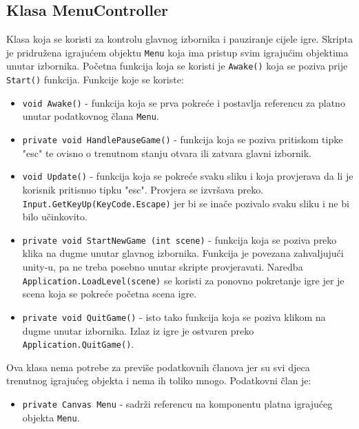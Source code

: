 \subsection{Klasa MenuController}
Klasa koja se koristi za kontrolu glavnog izbornika i pauziranje cijele igre. Skripta je pridružena igrajućem objektu \texttt{Menu} koja ima pristup svim igrajućim objektima unutar izbornika. Početna funkcija koja se koristi je \texttt{Awake()} koja se poziva prije \texttt{Start()} funkcija. Funkcije koje se koriste:
\begin{itemize}
	\item \texttt{void Awake()} - funkcija koja se prva pokreće i postavlja referencu za platno unutar podatkovnog člana \texttt{Menu}.
	\item \texttt{private void HandlePauseGame()} - funkcija koja se poziva pritiskom tipke "esc" te ovisno o trenutnom stanju otvara ili zatvara glavni izbornik.
	\item \texttt{void Update()} - funkcija koja se pokreće svaku sliku i koja provjerava da li je korisnik pritisnuo tipku "esc". Provjera se izvršava preko. \texttt{Input.GetKeyUp(KeyCode.Escape)} jer bi se inače pozivalo svaku sliku i ne bi bilo učinkovito.
	\item \texttt{private void StartNewGame (int scene)} - funkcija koja se poziva preko klika na dugme unutar glavnog izbornika. Funkcija je povezana zahvaljujući unity-u, pa ne treba posebno unutar skripte provjeravati. Naredba \texttt{Application.LoadLevel(scene)} se koristi za ponovno pokretanje igre jer je scena koja se pokreće početna scena igre.
	\item \texttt{private void QuitGame()} - isto tako funkcija koja se poziva klikom na dugme unutar izbornika. Izlaz iz igre je ostvaren preko \newline \texttt{Application.QuitGame()}.
\end{itemize}
Ova klasa nema potrebe za previše podatkovnih članova jer su svi djeca trenutnog igrajućeg objekta i nema ih toliko mnogo. Podatkovni član je:
\begin{itemize}
	\item \texttt{private Canvas Menu} - sadrži referencu na komponentu platna igrajućeg objekta \texttt{Menu}.
\end{itemize}
\newpage
